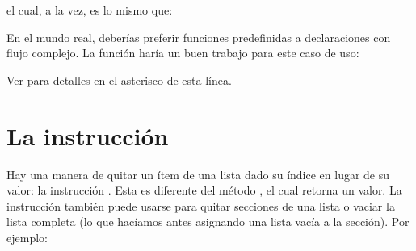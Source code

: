 \documentclass[a4,10pt,spanish]{sphinxmanual}
\begin{document}
\sphinxAtStartPar
el cual, a la vez, es lo mismo que:

\begin{sphinxVerbatim}[commandchars=\\\{\}]
  \PYG{p}{[}\PYG{p}{]}
   
    
      \PYG{p}{[}\PYG{p}{]}
       
        \PYG{p}{[}\PYG{p}{]}
    
\end{sphinxVerbatim}

\sphinxAtStartPar
En el mundo real, deberías preferir funciones predefinidas a declaraciones con flujo complejo.  La función  haría un buen trabajo para este caso de uso:

\begin{sphinxVerbatim}[commandchars=\\\{\}]
\end{sphinxVerbatim}

\sphinxAtStartPar
Ver {\hyperref[\detokenize{tutorial/controlflow:tut-unpacking-arguments}]{}} para detalles en el asterisco de esta línea.


\section{La instrucción }
\label{\detokenize{tutorial/datastructures:the-del-statement}}\label{\detokenize{tutorial/datastructures:tut-del}}
\sphinxAtStartPar
Hay una manera de quitar un ítem de una lista dado su índice en lugar de su valor: la instrucción .  Esta es diferente del método , el cual retorna un valor.  La instrucción  también puede usarse para quitar secciones de una lista o vaciar la lista completa (lo que hacíamos antes asignando una lista vacía a la sección).  Por ejemplo:
\end{document}
